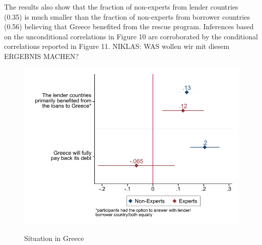 \clearpage
 The results also show that the fraction of non-experts from lender countries (0.35) is much smaller than the fraction of non-experts from borrower countries (0.56) believing that Greece benefited from the rescue program. Inferences based on the unconditional correlations in Figure 10 are corroborated by the conditional correlations reported in Figure 11.
 NIKLAS: WAS wollen wir mit diesem ERGEBNIS MACHEN? 
 \\
\begin{figure}[h!] 
\begin{center}
     \caption{Situation in Greece}
     \includegraphics[scale=0.8]{Question6_7_base.pdf}
     \label{fig:my_label}
     \end{center}
     \tiny
\end{figure}
